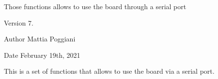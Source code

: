 Those functions allows to use the board through a serial port\begin{DoxyVersion}{Version}
7.
\end{DoxyVersion}
\begin{DoxyAuthor}{Author}
Mattia Poggiani
\end{DoxyAuthor}
\begin{DoxyDate}{Date}
February 19th, 2021
\end{DoxyDate}
This is a set of functions that allows to use the board via a serial port. 